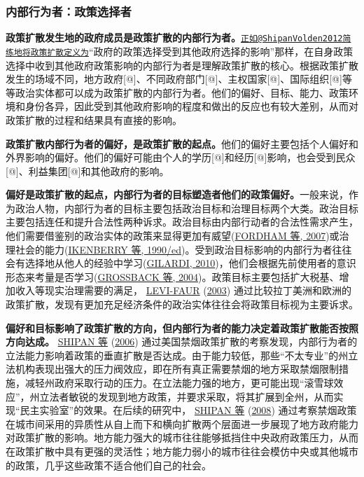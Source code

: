 \documentclass[
  12pt,
]{ctexart}
\begin{document}
\hypertarget{ux5185ux90e8ux884cux4e3aux8005ux653fux7b56ux9009ux62e9ux8005}{%
\subsubsection{内部行为者：政策选择者}\label{ux5185ux90e8ux884cux4e3aux8005ux653fux7b56ux9009ux62e9ux8005}}

\textbf{政策扩散发生地的政府成员是政策扩散的内部行为者。}\href{mailto:正如@ShipanVolden2012简练地将政策扩散定义为}{\nolinkurl{正如@ShipanVolden2012简练地将政策扩散定义为}}``政府的政策选择受到其他政府选择的影响''那样，在自身政策选择中收到其他政府政策影响的内部行为者是理解政策扩散的核心。根据政策扩散发生的场域不同，地方政府{[}@{]}、不同政府部门{[}@{]}、主权国家{[}@{]}、国际组织{[}@{]}等等政治实体都可以成为政策扩散的内部行为者。他们的偏好、目标、能力、政策环境和身份各异，因此受到其他政府影响的程度和做出的反应也有较大差别，从而对政策扩散的过程和结果具有直接的影响。

\textbf{政策扩散内部行为者的偏好，是政策扩散的起点。}他们的偏好主要包括个人偏好和外界影响的偏好。他们的偏好可能由个人的学历{[}@{]}和经历{[}@{]}影响，也会受到民众{[}@{]}、利益集团{[}@{]}和其他政府的影响。

\textbf{偏好是政策扩散的起点，内部行为者的目标塑造者他们的政策偏好。}一般来说，作为政治人物，内部行为者的目标主要包括政治目标和治理目标两个大类。政治目标主要包括连任和提升合法性两种诉求。政治目标由内部行动者的合法性需求产生，他们需要借鉴别的政治实体的政策来显得更加有威望(\protect\hyperlink{ref-FordhamAsal2007}{FORDHAM 等, 2007})或治理社会的能力(\protect\hyperlink{ref-IkenberryKupchan1990}{IKENBERRY 等, 1990/ed})。受到政治目标影响的内部行为者往往会有选择地从他人的经验中学习(\protect\hyperlink{ref-Gilardi2010b}{GILARDI, 2010})，他们会根据先前使用者的意识形态来考量是否学习(\protect\hyperlink{ref-GrossbackEtAl2004a}{GROSSBACK 等, 2004})。政策目标主要包括扩大税基、增加收入等现实治理需要的满足， \protect\hyperlink{ref-Levi-Faur2003}{LEVI-FAUR} (\protect\hyperlink{ref-Levi-Faur2003}{2003}) 通过比较拉丁美洲和欧洲的政策扩散，发现有更加充足经济条件的政治实体往往会将政策目标视为主要诉求。

\textbf{偏好和目标影响了政策扩散的方向，但内部行为者的能力决定着政策扩散能否按照方向达成。} \protect\hyperlink{ref-ShipanVolden2006}{SHIPAN 等} (\protect\hyperlink{ref-ShipanVolden2006}{2006}) 通过美国禁烟政策扩散的考察发现，内部行为者的立法能力影响着政策的垂直扩散是否达成。由于能力较低，那些``不太专业''的州立法机构表现出强大的压力阀效应，即在所有真正需要禁烟的地方采取禁烟限制措施，减轻州政府采取行动的压力。在立法能力强的地方，更可能出现``滚雪球效应''，州立法者敏锐的发现到地方政策，并要求采取，将其扩展到全州，从而实现``民主实验室''的效果。在后续的研究中， \protect\hyperlink{ref-ShipanVolden2008}{SHIPAN 等} (\protect\hyperlink{ref-ShipanVolden2008}{2008}) 通过考察禁烟政策在城市间采用的异质性从自上而下和横向扩散两个层面进一步展现了地方政府能力对政策扩散的影响。地方能力强大的城市往往能够抵挡住中央政府政策压力，从而在政策扩散中具有更强的灵活性；地方能力弱小的城市往往会模仿中央或其他城市的政策，几乎这些政策不适合他们自己的社会。
\end{document}
